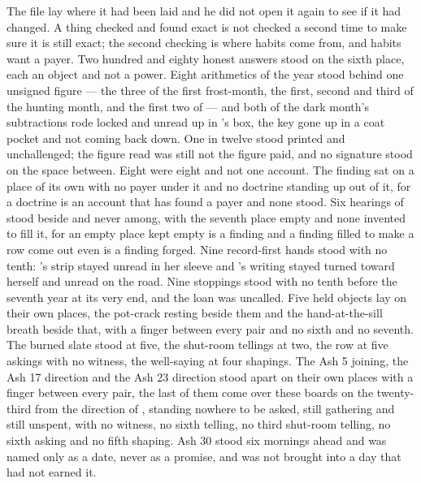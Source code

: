 The file lay where it had been laid and he did not open it again to see if it had changed. A thing checked and found exact is not checked a second time to make sure it is still exact; the second checking is where habits come from, and habits want a payer. Two hundred and eighty honest answers stood on the sixth place, each an object and not a power. Eight arithmetics of the year stood behind one unsigned figure --- the three of the first frost-month, the first, second and third of the hunting month, and the first two of  --- and both of the dark month's subtractions rode locked and unread up  in 's box, the key gone up in a coat pocket and not coming back down. One in twelve stood printed and unchallenged; the figure read was still not the figure paid, and no signature stood on the space between. Eight were eight and not one account. The finding sat on a place of its own with no payer under it and no doctrine standing up out of it, for a doctrine is an account that has found a payer and none stood. Six hearings of  stood beside and never among, with the seventh place empty and none invented to fill it, for an empty place kept empty is a finding and a finding filled to make a row come out even is a finding forged. Nine record-first hands stood with no tenth: 's strip stayed unread in her sleeve and 's writing stayed turned toward herself and unread on the road. Nine stoppings stood with no tenth before the seventh year at its very end, and the loan was uncalled. Five held objects lay on their own places, the pot-crack resting beside them and the hand-at-the-sill breath beside that, with a finger between every pair and no sixth and no seventh. The burned slate stood at five, the shut-room tellings at two, the row at five askings with no witness, the well-saying at four shapings. The Ash 5 joining, the Ash 17 direction and the Ash 23 direction stood apart on their own places with a finger between every pair, the last of them come over these boards on the twenty-third from the direction of , standing nowhere to be asked, still gathering and still unspent, with no witness, no sixth telling, no third shut-room telling, no sixth asking and no fifth shaping. Ash 30 stood six mornings ahead and was named only as a date, never as a promise, and was not brought into a day that had not earned it.

